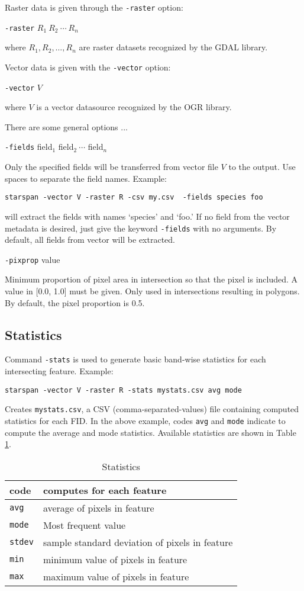 \documentclass{elsart}
\begin{document}
Raster data is given through the \verb|-raster| option:

	\verb|-raster| $R_1\ R_2\ \cdots\ R_n$

where $R_1, R_2, \ldots, R_n$ are raster datasets recognized by the GDAL library.

Vector data is given with the \verb|-vector| option:
	
	\verb|-vector| $V$

where $V$ is a vector datasource recognized by the OGR library.

There are some general options ...

	\verb|-fields| field$_1$ field$_2\ \cdots$ field$_n$
	
Only the specified fields will be transferred from vector file $V$
to the output. Use spaces to separate the field names.  Example:

   \verb|starspan -vector V -raster R -csv my.csv  -fields species foo|

will extract the fields with names `species' and `foo.' If no field from the
vector metadata is desired, just give the keyword \verb|-fields| with no
arguments. By default, all fields from vector will be extracted.

	\verb|-pixprop| value

Minimum proportion of pixel area in intersection so that the pixel is included.
A value in [0.0, 1.0] must be given.
Only used in intersections resulting in polygons. 
By default, the pixel proportion is 0.5. 

\subsection{Statistics}

Command \verb|-stats| is used to generate basic band-wise statistics for each
intersecting feature. Example:

	\verb|starspan -vector V -raster R -stats mystats.csv avg mode|

Creates \verb|mystats.csv|, a CSV (comma-separated-values) file containing
computed statistics for each FID. In the above example, codes \verb|avg| and
\verb|mode|
indicate to compute the average and mode statistics. Available statistics 
are shown in Table \ref{table-stats}.
\begin{table}[!ht]
\centering
\caption{Statistics}
\begin{tabular}{|l|l|}
\hline 
 code        & computes for each feature\\
\hline
\verb|avg  |  &   average of pixels in feature\\
\verb|mode |  &   Most frequent value\\
\verb|stdev|  &   sample standard deviation of pixels in feature\\
\verb|min  |  &   minimum value of pixels in feature\\
\verb|max  |  &   maximum value of pixels in feature\\
\hline
\end{tabular}
\label{table-stats}
\end{table}
\end{document}
